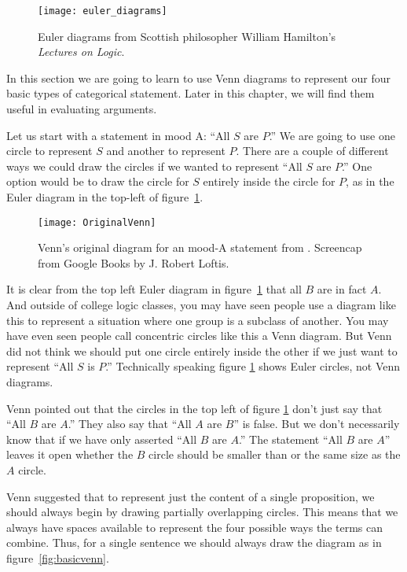 \begin{figure}
\begin{center}
\texttt{[image: euler\_diagrams]}
\end{center}
\caption{Euler diagrams from Scottish philosopher William Hamilton's \textit{Lectures on Logic}.}
\label{fig:euler_circles}
\end{figure}

In this section we are going to learn to use Venn diagrams to represent our four basic types of categorical statement. Later in this chapter, we will find them useful in evaluating arguments.

Let us start with a statement in mood A: ``All $S$ are $P$.'' We are going to use one circle to represent $S$ and another to represent $P$. There are a couple of different ways we could draw the circles if we wanted to represent ``All $S$ are $P$.'' One option would be to draw the circle for $S$ entirely inside the circle for $P$, as in the Euler diagram in the top-left of figure~\ref{fig:euler_circles}.

\begin{figure}[!ht]
\begin{center}
\texttt{[image: OriginalVenn]}
\end{center}
\caption{Venn's original diagram for an mood-A statement from \parencite{Venn1880a}. Screencap from Google Books by J. Robert Loftis.}
\end{figure}


It is clear from the top left Euler diagram in figure~\ref{fig:euler_circles} that all $B$ are in fact $A$. And outside of college logic classes, you may have seen people use a diagram like this to represent a situation where one group is a subclass of another. You may have even seen people call concentric circles like this a Venn diagram. But Venn did not think we should put one circle entirely inside the other if we just want to represent ``All $S$ is $P$.'' Technically speaking figure \ref{fig:euler_circles} shows Euler circles, not Venn diagrams.

Venn pointed out that the circles in the top left of figure \ref{fig:euler_circles} don't just say that ``All $B$ are $A$.'' They also say that ``All $A$ are $B$'' is false. But we don't necessarily know that if we have only asserted ``All $B$ are $A$.'' The statement ``All $B$ are $A$'' leaves it open whether the $B$ circle should be smaller than or the same size as the $A$ circle.

Venn suggested that to represent just the content of a single proposition, we should always begin by drawing partially overlapping circles. This means that we always have spaces available to represent the four possible ways the terms can combine. Thus, for a single sentence we should always draw the diagram as in figure~\ref{fig:basicvenn}.

